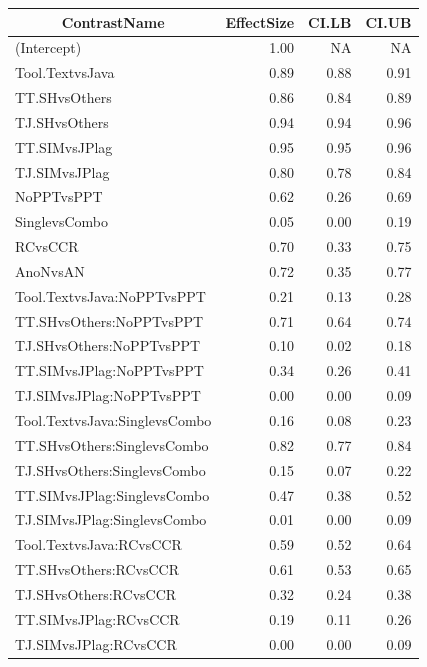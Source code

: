 \documentclass[a4paper, 12pt, oneside, openany, final, pdftex]{book}\usepackage[]{graphicx}\usepackage[]{color}
\begin{document}
\begin{appendices}
\begin{table}[ht]
\begin{threeparttable}
\begin{tabular}{lrrr}
\toprule
\multicolumn{1}{c}{\textbf{ContrastName}} & \multicolumn{1}{c}{\textbf{EffectSize}} & \multicolumn{1}{c}{\textbf{CI.LB}} & \multicolumn{1}{c}{\textbf{CI.UB}}\\
\midrule
\rowcolor{gray!6}  (Intercept) & 1.00 & NA & NA\\
Tool.TextvsJava & 0.89 & 0.88 & 0.91\\
\rowcolor{gray!6}  TT.SHvsOthers & 0.86 & 0.84 & 0.89\\
TJ.SHvsOthers & 0.94 & 0.94 & 0.96\\
\rowcolor{gray!6}  TT.SIMvsJPlag & 0.95 & 0.95 & 0.96\\
TJ.SIMvsJPlag & 0.80 & 0.78 & 0.84\\
\rowcolor{gray!6}  NoPPTvsPPT & 0.62 & 0.26 & 0.69\\
SinglevsCombo & 0.05 & 0.00 & 0.19\\
\rowcolor{gray!6}  RCvsCCR & 0.70 & 0.33 & 0.75\\
AnoNvsAN & 0.72 & 0.35 & 0.77\\
\hline
\rowcolor{gray!6}  Tool.TextvsJava:NoPPTvsPPT & 0.21 & 0.13 & 0.28\\
TT.SHvsOthers:NoPPTvsPPT & 0.71 & 0.64 & 0.74\\
\rowcolor{gray!6}  TJ.SHvsOthers:NoPPTvsPPT & 0.10 & 0.02 & 0.18\\
TT.SIMvsJPlag:NoPPTvsPPT & 0.34 & 0.26 & 0.41\\
\rowcolor{gray!6}  TJ.SIMvsJPlag:NoPPTvsPPT & 0.00 & 0.00 & 0.09\\
Tool.TextvsJava:SinglevsCombo & 0.16 & 0.08 & 0.23\\
\rowcolor{gray!6}  TT.SHvsOthers:SinglevsCombo & 0.82 & 0.77 & 0.84\\
TJ.SHvsOthers:SinglevsCombo & 0.15 & 0.07 & 0.22\\
\rowcolor{gray!6}  TT.SIMvsJPlag:SinglevsCombo & 0.47 & 0.38 & 0.52\\
TJ.SIMvsJPlag:SinglevsCombo & 0.01 & 0.00 & 0.09\\
\rowcolor{gray!6}  Tool.TextvsJava:RCvsCCR & 0.59 & 0.52 & 0.64\\
TT.SHvsOthers:RCvsCCR & 0.61 & 0.53 & 0.65\\
\rowcolor{gray!6}  TJ.SHvsOthers:RCvsCCR & 0.32 & 0.24 & 0.38\\
TT.SIMvsJPlag:RCvsCCR & 0.19 & 0.11 & 0.26\\
\rowcolor{gray!6}  TJ.SIMvsJPlag:RCvsCCR & 0.00 & 0.00 & 0.09\\

\end{tabular}
\end{threeparttable}
\end{table}
\end{appendices}
\end{document}
